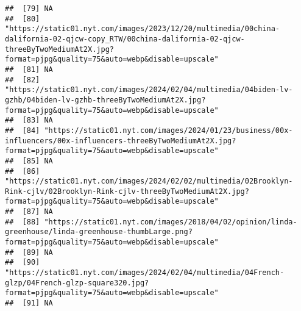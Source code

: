 \documentclass[
]{article}
\begin{document}
\begin{verbatim}
##  [79] NA                                                                                                                                                                                                    
##  [80] "https://static01.nyt.com/images/2023/12/20/multimedia/00china-dalifornia-02-qjcw-copy_RTW/00china-dalifornia-02-qjcw-threeByTwoMediumAt2X.jpg?format=pjpg&quality=75&auto=webp&disable=upscale"      
##  [81] NA                                                                                                                                                                                                    
##  [82] "https://static01.nyt.com/images/2024/02/04/multimedia/04biden-lv-gzhb/04biden-lv-gzhb-threeByTwoMediumAt2X.jpg?format=pjpg&quality=75&auto=webp&disable=upscale"                                     
##  [83] NA                                                                                                                                                                                                    
##  [84] "https://static01.nyt.com/images/2024/01/23/business/00x-influencers/00x-influencers-threeByTwoMediumAt2X.jpg?format=pjpg&quality=75&auto=webp&disable=upscale"                                       
##  [85] NA                                                                                                                                                                                                    
##  [86] "https://static01.nyt.com/images/2024/02/02/multimedia/02Brooklyn-Rink-cjlv/02Brooklyn-Rink-cjlv-threeByTwoMediumAt2X.jpg?format=pjpg&quality=75&auto=webp&disable=upscale"                           
##  [87] NA                                                                                                                                                                                                    
##  [88] "https://static01.nyt.com/images/2018/04/02/opinion/linda-greenhouse/linda-greenhouse-thumbLarge.png?format=pjpg&quality=75&auto=webp&disable=upscale"                                                
##  [89] NA                                                                                                                                                                                                    
##  [90] "https://static01.nyt.com/images/2024/02/04/multimedia/04French-glzp/04French-glzp-square320.jpg?format=pjpg&quality=75&auto=webp&disable=upscale"                                                    
##  [91] NA                                                                                                                                                                                                    

\end{verbatim}
\end{document}
